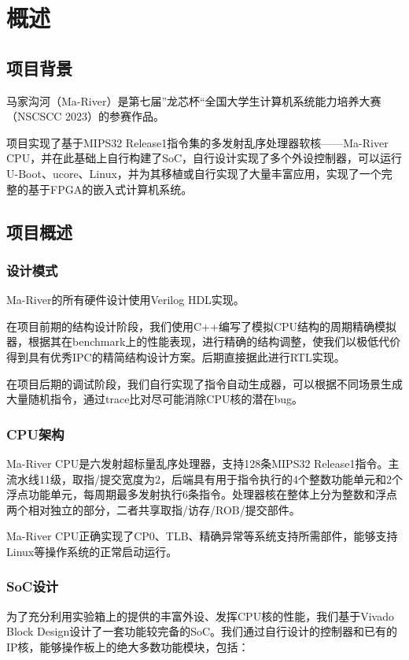 \chapter{概述}

\section{项目背景}

马家沟河（Ma-River）是第七届”龙芯杯“全国大学生计算机系统能力培养大赛（NSCSCC 2023）的参赛作品。

项目实现了基于MIPS32 Release1指令集的多发射乱序处理器软核——Ma-River CPU，并在此基础上自行构建了SoC，自行设计实现了多个外设控制器，可以运行U-Boot、ucore、Linux，并为其移植或自行实现了大量丰富应用，实现了一个完整的基于FPGA的嵌入式计算机系统。

\section{项目概述}

\subsection{设计模式}

Ma-River的所有硬件设计使用Verilog HDL实现。

在项目前期的结构设计阶段，我们使用C++编写了模拟CPU结构的周期精确模拟器，根据其在benchmark上的性能表现，进行精确的结构调整，使我们以极低代价得到具有优秀IPC的精简结构设计方案。后期直接据此进行RTL实现。

在项目后期的调试阶段，我们自行实现了指令自动生成器，可以根据不同场景生成大量随机指令，通过trace比对尽可能消除CPU核的潜在bug。

\subsection{CPU架构}

Ma-River CPU是六发射超标量乱序处理器，支持128条MIPS32 Release1指令。主流水线11级，取指/提交宽度为2，后端具有用于指令执行的4个整数功能单元和2个浮点功能单元，每周期最多发射执行6条指令。处理器核在整体上分为整数和浮点两个相对独立的部分，二者共享取指/访存/ROB/提交部件。

Ma-River CPU正确实现了CP0、TLB、精确异常等系统支持所需部件，能够支持Linux等操作系统的正常启动运行。

\subsection{SoC设计}
为了充分利用实验箱上的提供的丰富外设、发挥CPU核的性能，我们基于Vivado Block Design设计了一套功能较完备的SoC。我们通过自行设计的控制器和已有的IP核，能够操作板上的绝大多数功能模块，包括：

